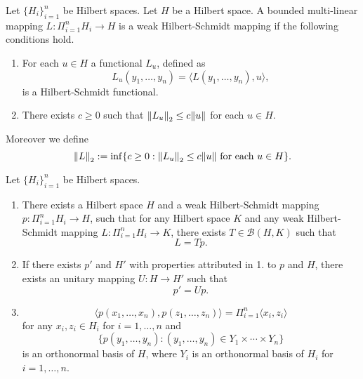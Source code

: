 \documentclass[main.tex]{subfiles}
\begin{document}
\begin{definition}
Let $\{H_i\}_{i=1}^n$ be Hilbert spaces. Let $H$ be a Hilbert space.
A bounded multi-linear mapping $L:\Pi_{i=1}^n H_i\to H$ is a weak Hilbert-Schmidt mapping if the following conditions hold.
\begin{enumerate}
\item
For each $u\in H$ a functional $L_u$, defined as
\begin{equation}
L_u(y_1,\dots, y_n) = \langle L(y_1,\dots, y_n), u \rangle,
\end{equation}
is a  Hilbert-Schmidt functional.
\item
There exists $c\geq 0$ such that $\norm{L_u}_2 \leq c\norm{u}$ for each $u\in H$.
\end{enumerate}
Moreover we define
\begin{equation}
\norm{L}_2:=\inf\{c\geq 0:  \norm{L_u}_2 \leq c\norm{u} \text{ for each } u\in H\}.
\end{equation}
\end{definition}
\begin{theorem}
Let $\{H_i\}_{i=1}^n$ be Hilbert spaces.
\begin{enumerate}
\item
There exists a Hilbert space $H$ and a weak Hilbert-Schmidt mapping $p:\Pi_{i=1}^n H_i\to H$, such that for any Hilbert space $K$ and any  weak Hilbert-Schmidt mapping $L:\Pi_{i=1}^n H_i\to K$, there exists $T\in\mathcal{B}(H,K)$ such that
\begin{equation}
L = Tp.
\end{equation}
\item If there exists $p'$ and $H'$ with properties attributed in 1. to $p$ and $H$, there exists an unitary mapping $U:H\to H'$ such that
\begin{equation}
p' = Up.
\end{equation}

\item
\begin{equation}
\langle p(x_1, \dots, x_n), p(z_1, \dots, z_n) \rangle = \Pi_{i=1}^n\langle x_i, z_i \rangle
\end{equation}
for any $x_i, z_i\in H_i$ for $i=1, \dots, n$ and
\begin{equation}
\{p(y_1,\dots, y_n): (y_1,\dots, y_n)\in Y_1\times\cdots\times Y_n\}
\end{equation}
is an orthonormal basis of $H$, where $Y_i$ is an orthonormal basis of $H_i$ for $i=1, \dots, n$.
\end{enumerate}
\end{theorem}
\end{document}
